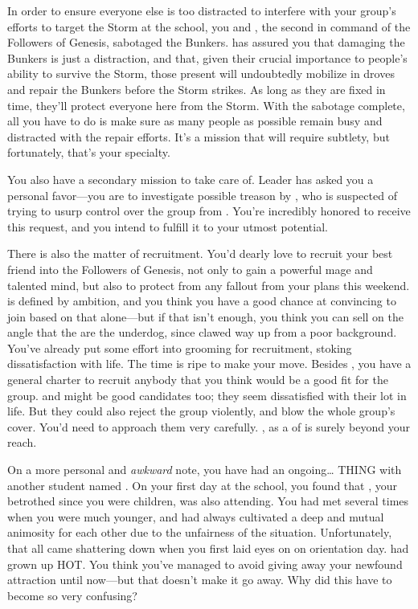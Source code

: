\documentclass[char]{GL2020}
\begin{document}
In order to ensure everyone else is too distracted to interfere with your group's efforts to target the Storm at the school, you and \cChupSecond{\full}, the second in command of the Followers of Genesis, sabotaged the Bunkers. \cChupSecond{} has assured you that damaging the Bunkers is just a distraction, and that, given their crucial importance to people's ability to survive the Storm, those present will undoubtedly mobilize in droves and repair the Bunkers before the Storm strikes. As long as they are fixed in time, they'll protect everyone here from the Storm. With the sabotage complete, all you have to do is make sure as many people as possible remain busy and distracted with the repair efforts. It's a mission that will require subtlety, but fortunately, that's your specialty.
 
You also have a secondary mission to take care of. Leader \cChupLeader{} has asked you a personal favor---you are to investigate possible treason by \cChupSecond{}, who is suspected of trying to usurp control over the group from \cChupLeader{}. You're incredibly honored to receive this request, and you intend to fulfill it to your utmost potential. 
 
There is also the matter of recruitment. You'd dearly love to recruit your best friend \cAmbition{} into the Followers of Genesis, not only to gain a powerful mage and talented mind, but also to protect \cAmbition{\them} from any fallout from your plans this weekend. \cAmbition{} is defined by \cAmbition{\their} ambition, and you think you have a good chance at convincing \cAmbition{\them} to join based on that alone---but if that isn't enough, you think you can sell \cAmbition{\them} on the angle that the \pGoaties{} are the underdog, since \cAmbition{} clawed \cAmbition{\their} way up from a poor background. You've already put some effort into grooming \cAmbition{\them} for recruitment, stoking \cAmbition{\their} dissatisfaction with life. The time is ripe to make your move. Besides \cAmbition{}, you have a general charter to recruit anybody that you think would be a good fit for the group. \cAdopted{} and \cLibAssist{} might be good candidates too; they seem dissatisfied with their lot in life. But they could also reject the group violently, and blow the whole group's cover. You'd need to approach them very carefully. \cDisney{}, as a \cDisney{\cleric} of \cFarmGod{} is surely beyond your reach.
 
On a more personal and \emph{awkward} note, you have had an ongoing\ldots{} THING with another student named \cHeir{\full}. On your first day at the school, you found that \cHeir{}, your betrothed since you were children, was also attending. You had met several times when you were much younger, and had always cultivated a deep and mutual animosity for each other due to the unfairness of the situation. Unfortunately, that all came shattering down when you first laid eyes on \cHeir{\them} on orientation day. \cHeir{} had grown up HOT. You think you've managed to avoid giving away your newfound attraction until now---but that doesn't make it go away. Why did this have to become so very confusing?
 
\end{document}
